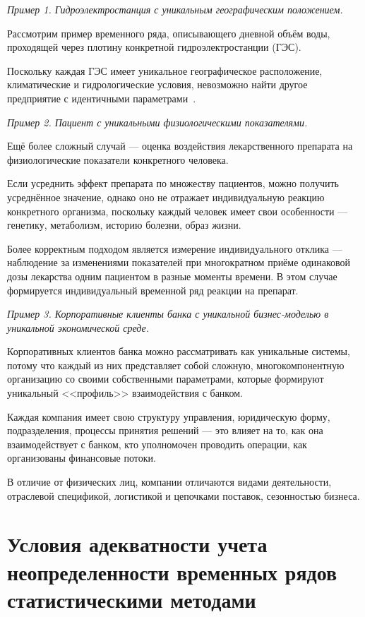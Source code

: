 \textit{Пример 1. Гидроэлектростанция с уникальным географическим положением.}

Рассмотрим пример временного ряда, описывающего дневной объём воды, проходящей через плотину конкретной гидроэлектростанции (ГЭС).

Поскольку каждая ГЭС имеет уникальное географическое расположение, климатические и гидрологические условия, невозможно найти другое предприятие с идентичными параметрами~\cite{PavlovHydrologySeries2024}. 

\textit{Пример 2. Пациент с уникальными физиологическими показателями.}

Ещё более сложный случай — оценка воздействия лекарственного препарата на физиологические показатели конкретного человека.

Если усреднить эффект препарата по множеству пациентов, можно получить усреднённое значение, однако оно не отражает индивидуальную реакцию конкретного организма, поскольку каждый человек имеет свои особенности — генетику, метаболизм, историю болезни, образ жизни.

Более корректным подходом является измерение индивидуального отклика — наблюдение за изменениями показателей при многократном приёме одинаковой дозы лекарства одним пациентом в разные моменты времени. В этом случае формируется индивидуальный временной ряд реакции на препарат.

\textit{Пример 3. Корпоративные клиенты банка с уникальной бизнес-моделью в уникальной экономической среде.}

Корпоративных клиентов банка можно рассматривать как уникальные системы, потому что каждый из них представляет собой сложную, многокомпонентную организацию со своими собственными параметрами, которые формируют уникальный <<профиль>> взаимодействия с банком.

Каждая компания имеет свою структуру управления, юридическую форму, подразделения, процессы принятия решений --- это влияет на то, как она взаимодействует с банком, кто уполномочен проводить операции, как организованы финансовые потоки.

В отличие от физических лиц, компании отличаются видами деятельности, отраслевой спецификой, логистикой и цепочками поставок, сезонностью бизнеса.

\section{Условия адекватности учета неопределенности временных рядов статистическими методами}

